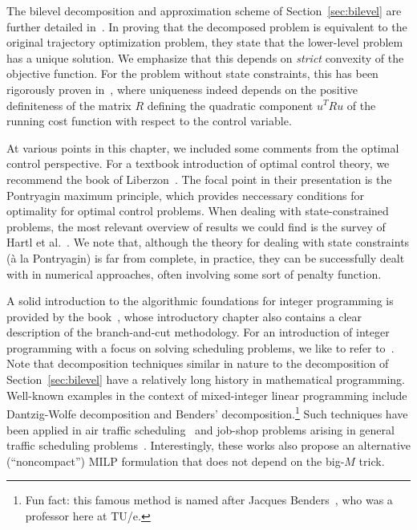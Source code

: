 \documentclass[a4paper]{report}
\theoremstyle{definition}
\theoremstyle{plain}
\begin{document}
The bilevel decomposition and approximation scheme of Section~\ref{sec:bilevel}
are further detailed in~\cite{hultApproximateSolutionOptimal2015,hultTechnicalReportApproximate}.
%
In proving that the decomposed problem is equivalent to the original trajectory
optimization problem, they state that the lower-level problem has a unique
solution. We emphasize that this depends on \emph{strict} convexity of the objective function.
%
For the problem without state constraints, this has been rigorously proven in~\cite[Theorem 5.1, part
(V)]{hanUnifiedNumericalScheme2012}, where uniqueness indeed depends on the positive
definiteness of the matrix $R$ defining the quadratic component $u^T R u$ of the
running cost function with respect to the control variable.

At various points in this chapter, we included some comments from the optimal
control perspective. For a textbook introduction of optimal control theory, we
recommend the book of Liberzon~\cite{liberzonCalculusVariationsOptimal}. The focal point in their presentation is the
Pontryagin maximum principle, which provides neccessary conditions for
optimality for optimal control problems.
%
When dealing with state-constrained problems, the most relevant overview of
results we could find is the survey of Hartl et al.~\cite{hartlSurveyMaximumPrinciples1995}.
%
We note that, although the theory for dealing with state constraints (\`a la
Pontryagin) is far from complete, in practice, they can be successfully dealt
with in numerical approaches, often involving some sort of penalty function.

A solid introduction to the algorithmic foundations for integer programming is
provided by the book~\cite{confortiIntegerProgramming2014}, whose introductory chapter also contains a clear
description of the branch-and-cut methodology. For an introduction of integer
programming with a focus on solving scheduling problems, we like to refer
to~\cite[Appendix A]{pinedoSchedulingTheoryAlgorithms2016}.
%
Note that decomposition techniques similar in nature to the decomposition of
Section~\ref{sec:bilevel} have a relatively long history in mathematical programming.
Well-known examples in the context of mixed-integer linear programming include
Dantzig-Wolfe decomposition and Benders' decomposition.\footnote{Fun fact: this
  famous method is named after Jacques
  Benders~\cite{aardalJacquesBendersHis2025}, who was a professor here at TU/e.}
%
Such techniques have been applied in air traffic
scheduling~\cite{manninoPathCycleFormulation2018} and job-shop problems arising
in general traffic scheduling
problems~\cite{lamorgeseNoncompactFormulationJobShop2019}.
%
Interestingly, these works also propose an alternative (``noncompact'') MILP
formulation that does not depend on the big-$M$ trick.
\end{document}
